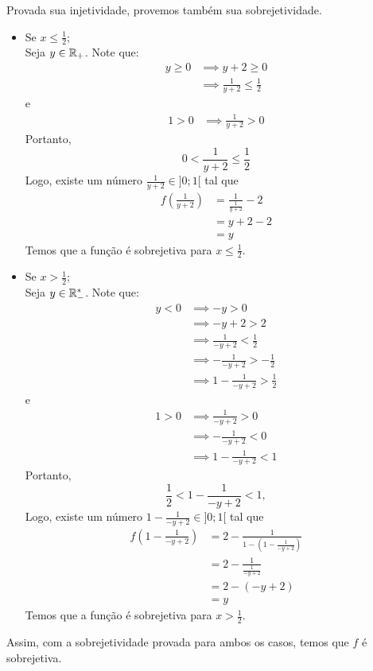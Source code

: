 Provada sua injetividade, provemos também sua sobrejetividade.
\begin{itemize}
    \item Se $x \le \frac{1}{2}$; \\
    Seja $y \in \mathbb R_+$. Note que:
    \begin{align*}
        y \ge 0 & \implies y + 2 \ge 0 \\ & \implies
        \frac{1}{y + 2} \le \frac{1}{2}
    \end{align*}
    e 
    \begin{align*}
        1 > 0 & \implies \frac{1}{y + 2} > 0
    \end{align*}
    Portanto, 
    \begin{displaymath} 
        0 < \frac{1}{y + 2} \le \frac{1}{2}
    \end{displaymath}
    Logo, existe um número $\frac{1}{y + 2} \in ]0; 1[$ tal que
    \begin{align*}
        f(\frac{1}{y + 2}) & = \frac{1}{\frac{1}{y + 2}} - 2 \\ & =
        y + 2 - 2 \\ & =
        y
    \end{align*}
    Temos que a função é sobrejetiva para $x \le \frac{1}{2}$.
    \item Se $x > \frac{1}{2}$; \\
    Seja $y \in \mathbb R_-^*$. Note que:
    \begin{align*}
        y < 0 & \implies -y > 0 \\ & \implies
        -y + 2 > 2 \\ & \implies
        \frac{1}{-y + 2} < \frac{1}{2} \\ & \implies
        -\frac{1}{-y + 2} > -\frac{1}{2} \\ & \implies
        1 - \frac{1}{-y + 2} > \frac{1}{2} 
    \end{align*}
    e
    \begin{align*}
        1 > 0 & \implies
        \frac{1}{-y + 2} > 0 \\ & \implies
        -\frac{1}{-y + 2} < 0 \\ & \implies
        1 - \frac{1}{-y + 2} < 1
    \end{align*}
    Portanto, 
    \begin{displaymath}
        \frac{1}{2} < 1 - \frac{1}{-y + 2} < 1,
    \end{displaymath}
    Logo, existe um número $1 - \frac{1}{-y + 2} \in ]0; 1[$ tal que
    \begin{align*}
        f(1 - \frac{1}{-y + 2}) & = 2 - \frac{1}{1 - (1 - \frac{1}{-y + 2})} \\ & =
        2 - \frac{1}{\frac{1}{-y + 2}} \\ & =
        2 - (-y + 2) \\ & =
        y
    \end{align*} 
    Temos que a função é sobrejetiva para $x > \frac{1}{2}$.
\end{itemize}
Assim, com a sobrejetividade provada para ambos os casos, temos que $f$ é sobrejetiva.